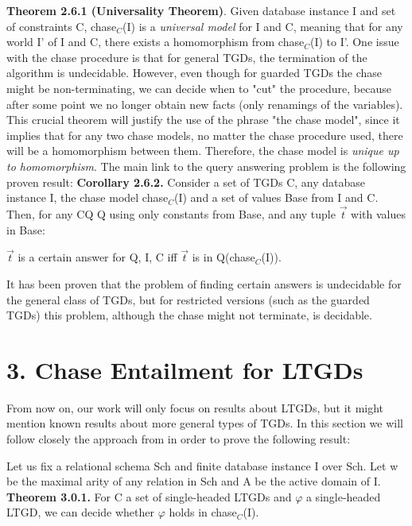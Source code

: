 \documentclass[11pt, a4paper, dvipsnames]{article}
\begin{document}
\textbf{Theorem 2.6.1 (Universality Theorem)}.  Given database instance I and set of constraints C, chase$_{C}$(I) is a \textit{universal model} for I and C, meaning that for any world I' of I and C, there exists a homomorphism from chase$_{C}$(I) to I'. \newline
One issue with the chase procedure is that for general TGDs, the termination of the algorithm is undecidable. However, even though for guarded TGDs the chase might be non-terminating, we can decide when to "cut" the procedure, because after some point we no longer obtain new facts (only renamings of the variables).\newline
This crucial theorem will justify the use of the phrase "the chase model", since it implies that for any two chase models, no matter the chase procedure used, there will be a homomorphism between them. Therefore, the chase model is \textit{unique up to homomorphism}. 
The main link to the query answering problem is the following proven result:\newline
\textbf{Corollary 2.6.2.} Consider a set of TGDs C, any database instance I, the chase model chase$_{C}$(I) and a set of values Base from I and C. Then, for any CQ Q using only constants from Base, and any tuple $\vec{t}$ with values in Base:
\begin{center}
$\vec{t}$ is a certain answer for Q, I, C iff $\vec{t}$ is in Q(chase$_{C}$(I)). 
\end{center}
It has been proven that the problem of finding certain answers is undecidable for the general class of TGDs, but for restricted versions (such as the guarded TGDs) this problem, although the chase might not terminate, is decidable. 

\newpage

\section{3. Chase Entailment for LTGDs}
From now on, our work will only focus on results about LTGDs, but it might mention known results about more general types of TGDs. In this section we will follow closely the approach from \cite{decidable} in order to prove the following result: \newline

\noindent Let us fix a relational schema Sch and finite database instance I over Sch. Let w be the maximal arity of any relation in Sch and A be the active domain of I. \newline
\textbf{Theorem 3.0.1.} For C a set of single-headed LTGDs and $\varphi$ a single-headed LTGD, we can decide whether $\varphi$ holds in chase$_{C}$(I). \newline
\end{document}
